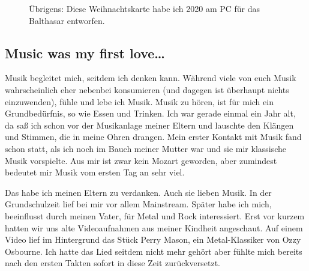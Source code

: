 \documentclass[fontsize=14pt,a4paper,headinclude,DIV=calc,automark]{scrbook}
\begin{document}
\setlength{\fboxsep}{0pt}    %
\setlength{\fboxrule}{0.2pt} %
\begin{figure}[ht]
    \raggedright
    \caption{Übrigens: Diese Weihnachtskarte habe ich 2020 am PC für das Balthasar entworfen.}
    \label{fig:weihnachtskarte}
\end{figure}

\subsection{Music was my first love…}

Musik begleitet mich, seitdem ich denken kann. Während viele von euch Musik wahrscheinlich eher nebenbei konsumieren (und dagegen ist überhaupt nichts einzuwenden), fühle und lebe ich Musik. Musik zu hören, ist für mich ein Grundbedürfnis, so wie Essen und Trinken. Ich war gerade einmal ein Jahr alt, da saß ich schon vor der Musikanlage meiner Eltern und lauschte den Klängen und Stimmen, die in meine Ohren drangen. Mein erster Kontakt mit Musik fand schon statt, als ich noch im Bauch meiner Mutter war und sie mir klassische Musik vorspielte. Aus mir ist zwar kein Mozart geworden, aber zumindest bedeutet mir Musik vom ersten Tag an sehr viel.

Das habe ich meinen Eltern zu verdanken. Auch sie lieben Musik. In der Grundschulzeit lief bei mir vor allem Mainstream. Später habe ich mich, beeinflusst durch meinen Vater, für Metal und Rock interessiert. Erst vor kurzem hatten wir uns alte Videoaufnahmen aus meiner Kindheit angeschaut. Auf einem Video lief im Hintergrund das Stück Perry Mason, ein Metal-Klassiker von Ozzy Osbourne. Ich hatte das Lied seitdem nicht mehr gehört aber fühlte mich bereits nach den ersten Takten sofort in diese Zeit zurückversetzt.
\end{document}
